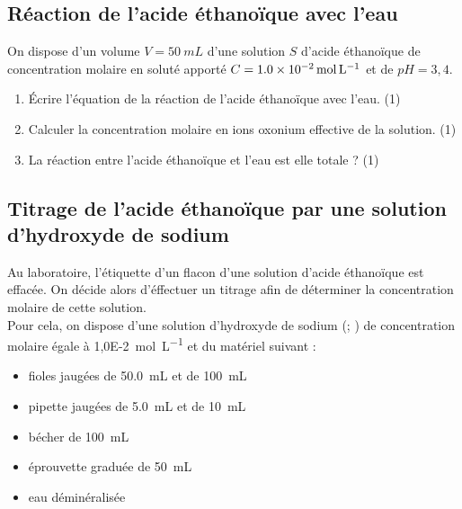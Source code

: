 \documentclass[a4paper,14pt,fleqn]{article}%
\begin{document}
\subsection{Réaction de l'acide éthanoïque avec l'eau}
    On dispose d'un volume $V=\SI{50}{mL}$ d'une solution $S$ d'acide éthanoïque de concentration molaire en soluté apporté $C=\SI{1,0E-2}{\mole\per\liter}$ et de $pH = 3,4$.
    \begin{enumerate}[resume]
        \item Écrire l'équation de la réaction de l'acide éthanoïque avec l'eau. (1)
        \item Calculer la concentration molaire en ions oxonium  effective de la solution. (1)
        \item La réaction entre l'acide éthanoïque et l'eau est elle totale ? (1)
    \end{enumerate}

\subsection{Titrage de l'acide éthanoïque par une solution d'hydroxyde de sodium}
    Au laboratoire, l'étiquette d'un flacon d'une solution d'acide éthanoïque est effacée. On décide alors d'éffectuer un titrage afin de déterminer la concentration molaire de cette solution.\\
    Pour cela, on dispose d'une solution d'hydroxyde de sodium (; ) de concentration molaire égale à \SI{1,0E-2}{\mole\per\liter} et du matériel suivant :
    \begin{itemize}
        \item fioles jaugées de \SI{50,0}{mL} et de \SI{100}{mL}
        \item pipette jaugées de \SI{5,0}{mL} et de \SI{10}{mL}
        \item bécher  de \SI{100}{mL}
        \item éprouvette graduée de \SI{50}{mL}
        \item eau déminéralisée
    \end{itemize}
\end{document}
